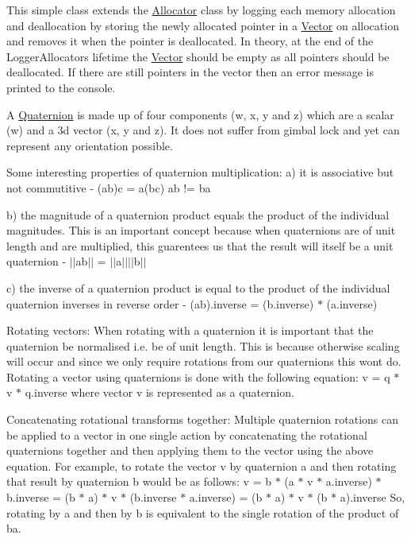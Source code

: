 This simple class extends the \hyperlink{classprism_1_1_allocator}{Allocator} class by logging each memory allocation and deallocation by storing the newly allocated pointer in a \hyperlink{classprism_1_1_vector}{Vector} on allocation and removes it when the pointer is deallocated. In theory, at the end of the Logger\+Allocator\textquotesingle{}s lifetime the \hyperlink{classprism_1_1_vector}{Vector} should be empty as all pointers should be deallocated. If there are still pointers in the vector then an error message is printed to the console.

A \hyperlink{classprism_1_1_quaternion}{Quaternion} is made up of four components (w, x, y and z) which are a scalar (w) and a 3d vector (x, y and z). It does not suffer from gimbal lock and yet can represent any orientation possible.

Some interesting properties of quaternion multiplication\+: a) it is associative but not commutitive -\/ (ab)c = a(bc) ab != ba

b) the magnitude of a quaternion product equals the product of the individual magnitudes. This is an important concept because when quaternions are of unit length and are multiplied, this guarentees us that the result will itself be a unit quaternion -\/ $\vert$$\vert$ab$\vert$$\vert$ = $\vert$$\vert$a$\vert$$\vert$$\vert$$\vert$b$\vert$$\vert$

c) the inverse of a quaternion product is equal to the product of the individual quaternion inverses in reverse order -\/ (ab).inverse = (b.\+inverse) $\ast$ (a.\+inverse)

Rotating vectors\+: When rotating with a quaternion it is important that the quaternion be normalised i.\+e. be of unit length. This is because otherwise scaling will occur and since we only require rotations from our quaternions this won\textquotesingle{}t do. Rotating a vector using quaternions is done with the following equation\+: v\textquotesingle{} = q $\ast$ v $\ast$ q.\+inverse where vector v is represented as a quaternion.

Concatenating rotational transforms together\+: Multiple quaternion rotations can be applied to a vector in one single action by concatenating the rotational quaternions together and then applying them to the vector using the above equation. For example, to rotate the vector v by quaternion a and then rotating that result by quaternion b would be as follows\+: v\textquotesingle{} = b $\ast$ (a $\ast$ v $\ast$ a.\+inverse) $\ast$ b.\+inverse = (b $\ast$ a) $\ast$ v $\ast$ (b.\+inverse $\ast$ a.\+inverse) = (b $\ast$ a) $\ast$ v $\ast$ (b $\ast$ a).inverse So, rotating by a and then by b is equivalent to the single rotation of the product of ba. 

